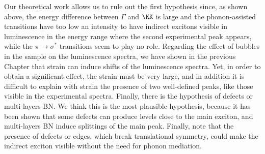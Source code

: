 Our theoretical work allows us to rule out the first hypothesis since, as shown above, the energy difference between $\Gamma$ and $\KK$ is large and the phonon-assisted transitions have too low an intensity to have indirect excitons visible in luminescence in the energy range where the second experimental peak appears, while the $\pi\rightarrow\sigma^*$ transitions seem to play no role. Regarding the effect of bubbles in the sample on the luminescence spectra, we have shown in the previous Chapter that strain can induce shifts of the luminescence spectra.\cite{lechifflart2022excitons}
Yet, in order to obtain a significant effect, the strain must be very large, and in addition it is difficult to explain with strain the presence of two well-defined peaks, like those visible in the experimental spectra. 
Finally, there is the hypothesis of defects or multi-layers BN. We think this is the most plausible hypothesis, because it has been shown that some defects can produce levels close to the main exciton,\cite{attaccalite2011coupling} and multi-layers BN induce splittings of the main peak.\cite{paleari2018excitons} 
Finally, note that the presence of defects or edges, which break translational symmetry, could make the indirect exciton visible without the need for phonon mediation.\cite{feierabend2017proposal}


%
